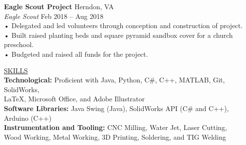 \documentclass{article}
\begin{document}
\large\textbf{Eagle Scout Project}  \hfill Herndon, VA\\
\large\textit{Eagle Scout} \hfill Feb 2018 – Aug 2018\\
\qquad • \quad Delegated and led volunteers through conception and construction of project.\\
\qquad • \quad Built raised planting beds and square pyramid sandbox cover for a church preschool.\\
\qquad • \quad Budgeted and raised all funds for the project.\\
\vspace{3mm} %


\underline{\Large S\normalsize KILLS\qquad\qquad\qquad\qquad\qquad\qquad\qquad\qquad\qquad\qquad\qquad\qquad\qquad\qquad\qquad\qquad\qquad\qquad\qquad\qquad\qquad\qquad\qquad\quad}\\
\large\textbf{Technological:} Proficient with Java, Python, C\#, C++, MATLAB, Git, SolidWorks, \\\qquad \LaTeX, Microsoft Office, and Adobe Illustrator \\
\large\textbf{Software Libraries:} Java Swing (Java), SolidWorks API (C\# and C++), Arduino (C++)\\
\large\textbf{Instrumentation and Tooling:} CNC Milling, Water Jet, Laser Cutting,\\\qquad Wood Working, Metal Working, 3D Printing, Soldering, and TIG Welding\\
\end{document}
